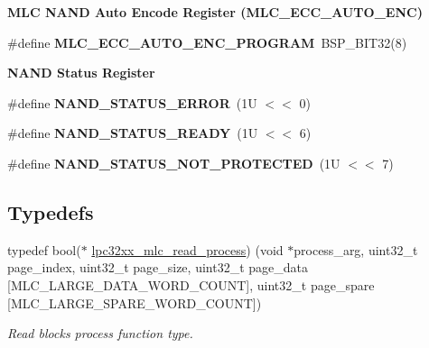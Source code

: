 \begin{Indent}\textbf{ M\+LC N\+A\+ND Auto Encode Register (M\+L\+C\+\_\+\+E\+C\+C\+\_\+\+A\+U\+T\+O\+\_\+\+E\+NC)}\par
\begin{DoxyCompactItemize}
\item 
\#define {\bfseries M\+L\+C\+\_\+\+E\+C\+C\+\_\+\+A\+U\+T\+O\+\_\+\+E\+N\+C\+\_\+\+P\+R\+O\+G\+R\+AM}~B\+S\+P\+\_\+\+B\+I\+T32(8)
\end{DoxyCompactItemize}
\end{Indent}
\begin{Indent}\textbf{ N\+A\+ND Status Register}\par
\begin{DoxyCompactItemize}
\item 
\#define {\bfseries N\+A\+N\+D\+\_\+\+S\+T\+A\+T\+U\+S\+\_\+\+E\+R\+R\+OR}~(1\+U $<$$<$ 0)
\item 
\#define {\bfseries N\+A\+N\+D\+\_\+\+S\+T\+A\+T\+U\+S\+\_\+\+R\+E\+A\+DY}~(1\+U $<$$<$ 6)
\item 
\#define {\bfseries N\+A\+N\+D\+\_\+\+S\+T\+A\+T\+U\+S\+\_\+\+N\+O\+T\+\_\+\+P\+R\+O\+T\+E\+C\+T\+ED}~(1\+U $<$$<$ 7)
\end{DoxyCompactItemize}
\end{Indent}
\subsection*{Typedefs}
\begin{DoxyCompactItemize}
\item 
typedef bool($\ast$ \mbox{\hyperlink{group__lpc32xx__nand__mlc_ga8adf1c46b26e07838b729a78d83332ee}{lpc32xx\+\_\+mlc\+\_\+read\+\_\+process}}) (void $\ast$process\+\_\+arg, uint32\+\_\+t page\+\_\+index, uint32\+\_\+t page\+\_\+size, uint32\+\_\+t page\+\_\+data \mbox{[}M\+L\+C\+\_\+\+L\+A\+R\+G\+E\+\_\+\+D\+A\+T\+A\+\_\+\+W\+O\+R\+D\+\_\+\+C\+O\+U\+NT\mbox{]}, uint32\+\_\+t page\+\_\+spare \mbox{[}M\+L\+C\+\_\+\+L\+A\+R\+G\+E\+\_\+\+S\+P\+A\+R\+E\+\_\+\+W\+O\+R\+D\+\_\+\+C\+O\+U\+NT\mbox{]})
\begin{DoxyCompactList}\small\item\em Read blocks process function type. \end{DoxyCompactList}\end{DoxyCompactItemize}
